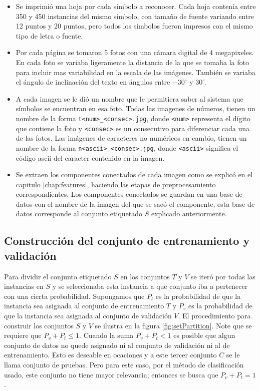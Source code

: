 \documentclass[a4paper, 11pt, oneside]{report}
\begin{document}
\begin{itemize}
	\item Se imprimió una hoja por cada símbolo a reconocer. Cada hoja contenía entre 350 y 450 instancias del mismo símbolo, con tamaño de fuente variando entre 12 puntos y 20 puntos, pero todos los símbolos fueron impresos con el mismo tipo de letra o fuente.
	\item Por cada página se tomaron 5 fotos con una cámara digital de 4 megapixeles. En cada foto se variaba ligeramente la distancia de la que se tomaba la foto para incluir mas variabilidad en la escala de las imágenes. También se variaba el ángulo de inclinación del texto en ángulos entre $-30^\circ$ y $30^\circ$.
	\item A cada imagen se le dió un nombre que le permitiera saber al sistema que símbolos se encuentran en esa foto. Todas las imagenes de números, tienen un nombre de la forma \verb/t<num>_<consec>.jpg/, donde \verb/<num>/ representa el dígito que contiene la foto y \verb/<consec>/ es un consecutivo para diferenciar cada una de las fotos. Las imágenes de caracteres no numéricos en cambio, tienen un nombre de la forma \verb/n<ascii>_<consec>.jpg/, donde \verb/<ascii>/ significa el código ascii del caracter contenido en la imagen.
	\item Se extraen los componentes conectados de cada imagen como se explicó en el capitulo \ref{chap:features}, haciendo las etapas de preprocesamiento correspondientes. Los componentes conectados se guardan en una base de datos con el nombre de la imagen del que se sacó el componente, esta base de datos corresponde al conjunto etiquetado $S$ explicado anteriormente.
\end{itemize}

\subsection{Construcción del conjunto de entrenamiento y validación}

Para dividir el conjunto etiquetado $S$ en los conjuntos $T$ y $V$ se iteró por todas las instancias en $S$ y se seleccionaba esta instancia a que conjunto iba a pertenecer con una cierta probabilidad. Supongamos que $P_t$ es la probabilidad de que la instancia sea asignada al conjunto de entrenamiento $T$ y $P_v$ es la probabilidad de que la instancia sea asignada al conjunto de validación $V$. El procedimiento para construir los conjuntos $S$ y $V$ se ilustra en la figura \ref{fig:setPartition}. \newline \newline
Note que se requiere que $P_v + P_t \le 1$. Cuando la suma $P_v + P_t < 1$ es posible que algun conjunto de datos no quede asignado ni al conjunto de validación ni al de entrenamiento. Esto es deseable en ocaciones y a este tercer conjunto $C$ se le llama conjunto de pruebas. Pero para este caso, por el método de clasificación usado, este conjunto no tiene mayor relevancia; entonces se busca que $P_v + P_t = 1$.
\end{document}
